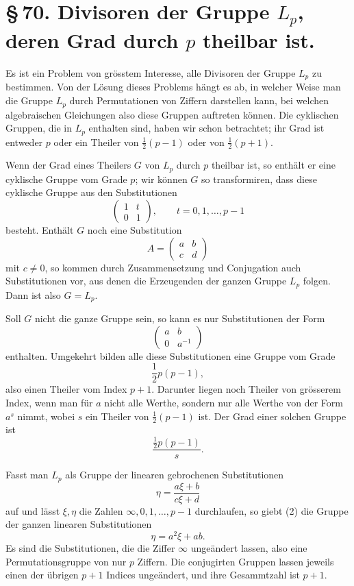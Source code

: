 \documentclass[11pt]{article}
\providecommand{\mat}[4]{\begin{pmatrix}#1&#2\\#3&#4\end{pmatrix}}
\providecommand{\mat}[4]{\begin{pmatrix}#1&#2\\#3&#4\end{pmatrix}}
\providecommand{\mat}[1]{\begin{pmatrix}#1\end{pmatrix}}
\begin{document}
\section*{\S\,70. Divisoren der Gruppe $L_p$, deren Grad durch $p$ theilbar ist.}

Es ist ein Problem von grösstem Interesse, alle Divisoren der Gruppe $L_p$ zu bestimmen. Von der Lösung dieses Problems hängt es ab, in welcher Weise man die Gruppe $L_p$ durch Permutationen von Ziffern darstellen kann, bei welchen algebraischen Gleichungen also diese Gruppen auftreten können. Die cyklischen Gruppen, die in $L_p$ enthalten sind, haben wir schon betrachtet; ihr Grad ist entweder $p$ oder ein Theiler von $\frac12(p-1)$ oder von $\frac12(p+1)$.

Wenn der Grad eines Theilers $G$ von $L_p$ durch $p$ theilbar ist, so enthält er eine cyklische Gruppe vom Grade $p$; wir können $G$ so transformiren, dass diese cyklische Gruppe aus den Substitutionen
\begin{equation}
 \mat{1}{t}{0}{1},\qquad t=0,1,\ldots,p-1
 \tag{1}
\end{equation}
besteht. Enthält $G$ noch eine Substitution
\[
 A=\mat{a}{b}{c}{d}
\]
mit $c\ne0$, so kommen durch Zusammensetzung und Conjugation auch Substitutionen vor, aus denen die Erzeugenden der ganzen Gruppe $L_p$ folgen. Dann ist also $G=L_p$.

Soll $G$ nicht die ganze Gruppe sein, so kann es nur Substitutionen der Form
\begin{equation}
 \mat{a}{b}{0}{a^{-1}}
 \tag{2}
\end{equation}
enthalten. Umgekehrt bilden alle diese Substitutionen eine Gruppe vom Grade
\[
 \frac12 p(p-1),
\]
also einen Theiler vom Index $p+1$. Darunter liegen noch Theiler von grösserem Index, wenn man für $a$ nicht alle Werthe, sondern nur alle Werthe von der Form $a^s$ nimmt, wobei $s$ ein Theiler von $\frac12(p-1)$ ist. Der Grad einer solchen Gruppe ist
\begin{equation}
 \frac{\frac12p(p-1)}{s}.
 \tag{3}
\end{equation}

Fasst man $L_p$ als Gruppe der linearen gebrochenen Substitutionen
\[
 \eta=\frac{a\xi+b}{c\xi+d}
\]
auf und lässt $\xi,\eta$ die Zahlen $\infty,0,1,\ldots,p-1$ durchlaufen, so giebt (2) die Gruppe der ganzen linearen Substitutionen
\[
 \eta=a^2\xi+ab.
\]
Es sind die Substitutionen, die die Ziffer $\infty$ ungeändert lassen, also eine Permutationsgruppe von nur $p$ Ziffern. Die conjugirten Gruppen lassen jeweils einen der übrigen $p+1$ Indices ungeändert, und ihre Gesammtzahl ist $p+1$.
\end{document}
